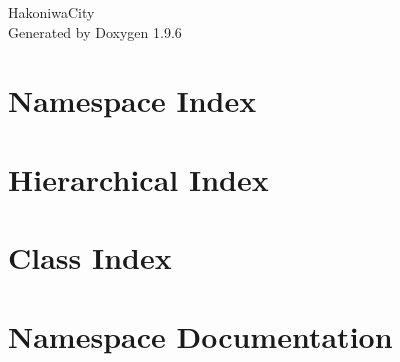 \documentclass[twoside]{book}
\newcommand{\+}{\discretionary{\mbox{\scriptsize$\hookleftarrow$}}{}{}}
\newcommand{\clearemptydoublepage}{%
    \newpage{\pagestyle{empty}\cleardoublepage}%
  }
\begin{document}
  \raggedbottom
    \hypersetup{pageanchor=false,
                bookmarksnumbered=true,
                pdfencoding=unicode
               }
  \begin{titlepage}
  \vspace*{7cm}
  \begin{center}%
  {\Large Hakoniwa\+City}\\
  \vspace*{1cm}
  {\large Generated by Doxygen 1.9.6}\\
  \end{center}
  \end{titlepage}
  \clearemptydoublepage
  \tableofcontents
  \clearemptydoublepage
  \hypersetup{pageanchor=true}
\chapter{Namespace Index}

\chapter{Hierarchical Index}

\chapter{Class Index}

\chapter{Namespace Documentation}







\end{document}
